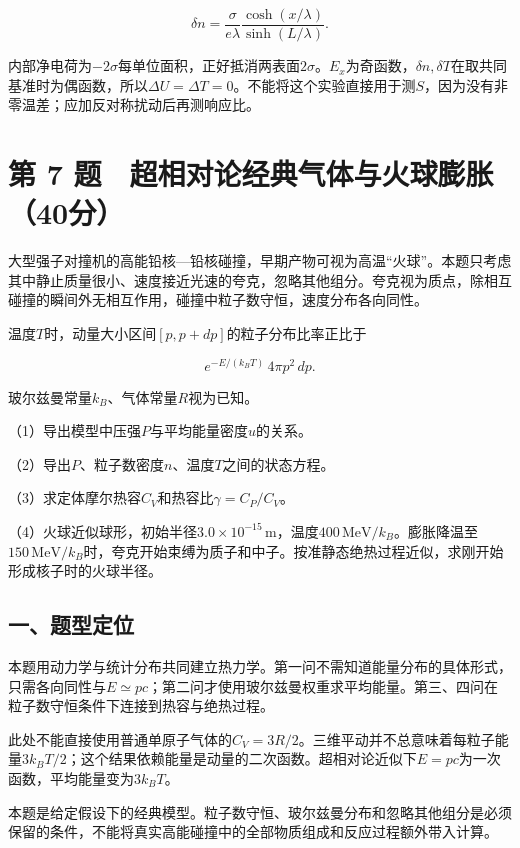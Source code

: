\documentclass[12pt,a4paper,fontset=fandol]{ctexart}
\begin{document}
\[
\delta n=\frac{\sigma}{e\lambda}
\frac{\cosh(x/\lambda)}{\sinh(L/\lambda)}.
\]

内部净电荷为\(-2\sigma\)每单位面积，正好抵消两表面\(2\sigma\)。\(E_x\)为奇函数，\(\delta n,\delta T\)在取共同基准时为偶函数，所以\(\Delta U=\Delta T=0\)。不能将这个实验直接用于测\(S\)，因为没有非零温差；应加反对称扰动后再测响应比。

\clearpage

\section{第 7
题　超相对论经典气体与火球膨胀（40分）}\label{ux7b2c-7-ux9898-ux8d85ux76f8ux5bf9ux8bbaux7ecfux5178ux6c14ux4f53ux4e0eux706bux7403ux81a8ux80c040ux5206}

大型强子对撞机的高能铅核---铅核碰撞，早期产物可视为高温``火球''。本题只考虑其中静止质量很小、速度接近光速的夸克，忽略其他组分。夸克视为质点，除相互碰撞的瞬间外无相互作用，碰撞中粒子数守恒，速度分布各向同性。

温度\(T\)时，动量大小区间\([p,p+dp]\)的粒子分布比率正比于

\[
e^{-E/(k_BT)}\,4\pi p^2\,dp.
\]

玻尔兹曼常量\(k_B\)、气体常量\(R\)视为已知。

（1）导出模型中压强\(P\)与平均能量密度\(u\)的关系。

（2）导出\(P\)、粒子数密度\(n\)、温度\(T\)之间的状态方程。

（3）求定体摩尔热容\(C_V\)和热容比\(\gamma=C_P/C_V\)。

（4）火球近似球形，初始半径\(3.0\times10^{-15}\,\mathrm m\)，温度\(400\,\mathrm{MeV}/k_B\)。膨胀降温至\(150\,\mathrm{MeV}/k_B\)时，夸克开始束缚为质子和中子。按准静态绝热过程近似，求刚开始形成核子时的火球半径。

\subsection{一、题型定位}\label{ux4e00ux9898ux578bux5b9aux4f4d-6}

本题用动力学与统计分布共同建立热力学。第一问不需知道能量分布的具体形式，只需各向同性与\(E\simeq pc\)；第二问才使用玻尔兹曼权重求平均能量。第三、四问在粒子数守恒条件下连接到热容与绝热过程。

此处不能直接使用普通单原子气体的\(C_V=3R/2\)。三维平动并不总意味着每粒子能量\(3k_BT/2\)；这个结果依赖能量是动量的二次函数。超相对论近似下\(E=pc\)为一次函数，平均能量变为\(3k_BT\)。

本题是给定假设下的经典模型。粒子数守恒、玻尔兹曼分布和忽略其他组分是必须保留的条件，不能将真实高能碰撞中的全部物质组成和反应过程额外带入计算。
\end{document}
